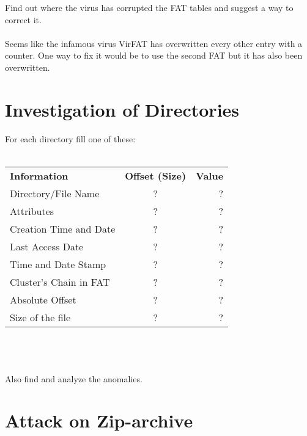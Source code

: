\documentclass{article}
\begin{document}
Find out where the virus has corrupted the FAT tables and suggest a way to correct it.\\
\\
Seems like the infamous virus VirFAT has overwritten every other entry with a counter. One way to fix it would be to use the second FAT but it has also been overwritten.

\section{Investigation of Directories}

For each directory fill one of these:\\
\\
\begin{tabular}{l c r}
    \hline
    \textbf{Information} & \textbf{Offset (Size)} & \textbf{Value}\\
    Directory/File Name & ? & ? \\
    Attributes & ? & ? \\
    Creation Time and Date & ? & ? \\
    Last Access Date & ? & ? \\
    Time and Date Stamp & ? & ? \\
    Cluster’s Chain in FAT & ? & ? \\
    Absolute Offset & ? & ? \\
    Size of the file & ? & ? \\
    \hline
\end{tabular}
\\
\\
\\
Also find and analyze the anomalies.
\section{Attack on Zip-archive}
\end{document}
